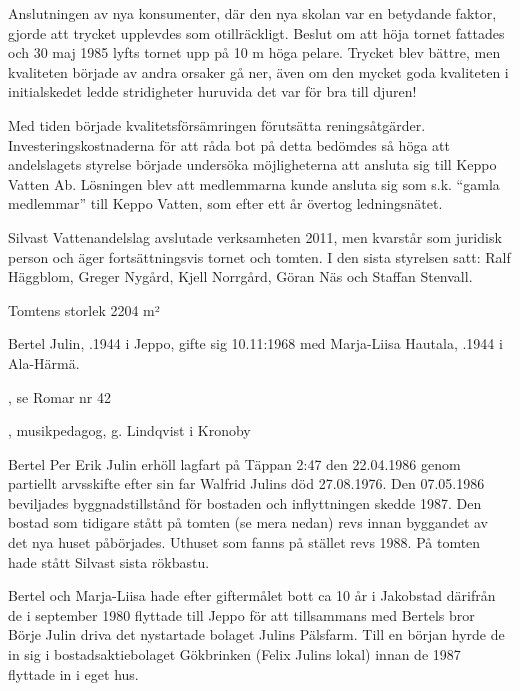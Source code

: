 Anslutningen av nya konsumenter, där den nya  skolan var en betydande faktor, gjorde att trycket upplevdes som otillräckligt. Beslut om att höja tornet fattades och 30 maj 1985 lyfts tornet upp på 10 m höga pelare. Trycket blev bättre, men kvaliteten började av andra orsaker gå ner, även om den mycket goda kvaliteten i initialskedet ledde stridigheter huruvida det var för bra till djuren!

Med tiden började kvalitetsförsämringen förutsätta reningsåtgärder. Investeringskostnaderna för att råda bot på detta bedömdes så höga att andelslagets styrelse började undersöka möjligheterna att ansluta sig till Keppo Vatten Ab. Lösningen blev att medlemmarna kunde ansluta sig som s.k. ``gamla medlemmar'' till Keppo Vatten, som efter ett år övertog ledningsnätet.

Silvast Vattenandelslag avslutade verksamheten 2011, men kvarstår som juridisk person och äger fortsättningsvis tornet och tomten. I den sista styrelsen satt: Ralf Häggblom, Greger Nygård, Kjell Norrgård, Göran Näs och Staffan Stenvall.



 Tomtens storlek 2204 m²



Bertel Julin, .1944 i Jeppo, gifte sig 10.11:1968 med Marja-Liisa Hautala, .1944 i Ala-Härmä.
\begin{jhchildren}
  \item {}, se Romar nr 42
  \item {}, musikpedagog, g. Lindqvist i Kronoby
\end{jhchildren}
Bertel Per Erik Julin erhöll lagfart på Täppan 2:47 den 22.04.1986 genom partiellt arvsskifte efter sin far Walfrid Julins död 27.08.1976. Den 07.05.1986 beviljades byggnadstillstånd för bostaden och inflyttningen skedde 1987. Den bostad som tidigare stått på tomten (se mera nedan) revs innan byggandet av det nya huset påbörjades. Uthuset som fanns på stället revs 1988. På tomten hade stått Silvast sista rökbastu.

Bertel och Marja-Liisa hade efter giftermålet bott ca 10 år i Jakobstad därifrån de i september 1980 flyttade till Jeppo för att tillsammans med Bertels bror Börje Julin driva det nystartade bolaget Julins Pälsfarm. Till en början hyrde de in sig i bostadsaktiebolaget Gökbrinken (Felix Julins lokal) innan de 1987 flyttade in i eget hus.

